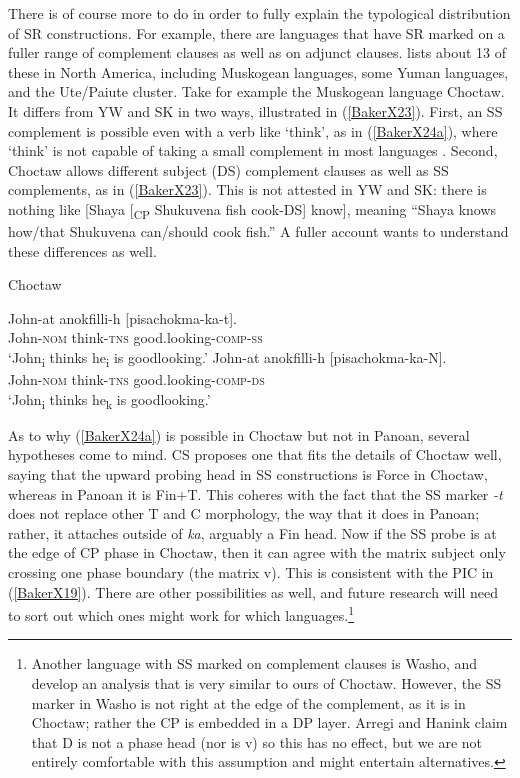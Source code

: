\documentclass[output=paper]{langscibook}
\begin{document}
There is of course more to do in order to fully explain the typological distribution of SR constructions. For example, there are languages that have SR marked on a fuller range of complement clauses as well as on adjunct clauses. \citet{mckenzie2015survey} lists about 13 of these in North America, including Muskogean languages, some Yuman languages, and the Ute/Paiute cluster. Take for example the Muskogean language Choctaw. It differs from YW and SK in two ways, illustrated in (\ref{BakerX23}). First, an SS complement is possible even with a verb like ‘think’, as in (\ref{BakerX24a}), where ‘think’ is not capable of taking a small complement in most languages \citep{wurmbrand2001infinitives}. Second, Choctaw allows different subject (DS) complement clauses as well as SS complements, as in (\ref{BakerX23}). This is not attested in YW and SK: there is nothing like [Shaya [\textsubscript{CP} Shukuvena fish cook-DS] know], meaning “Shaya knows how/that Shukuvena can/should cook fish.” A fuller account wants to understand these differences as well.

\begin{exe}
    \ex Choctaw \citep[269]{broadwell2006choctaw} \label{BakerX24}
	    \begin{xlist}
			\ex \label{BakerX24a}
			\gll John-at anokfilli-h [pisachokma-ka-t].\\
			    John-\textsc{nom} think-\textsc{tns} good.looking-\textsc{comp-ss}\\
			    \glt `John\textsubscript{i} thinks he\textsubscript{i} is goodlooking.'
			\ex \label{BakerX24b}
			\gll John-at anokfilli-h [pisachokma-ka-N].\\
    			 John-\textsc{nom} think-\textsc{tns} good.looking-\textsc{comp-ds}\\
			    \glt `John\textsubscript{i} thinks he\textsubscript{k} is goodlooking.'
		\end{xlist}
\end{exe}

As to why (\ref{BakerX24a}) is possible in Choctaw but not in Panoan, several hypotheses come to mind. CS proposes one that fits the details of Choctaw well, saying that the upward probing head in SS constructions is Force in Choctaw, whereas in Panoan it is Fin+T. This coheres with the fact that the SS marker \textit{-t} does not replace other T and C morphology, the way that it does in Panoan; rather, it attaches outside of \textit{ka}, arguably a Fin head. Now if the SS probe is at the edge of CP phase in Choctaw, then it can agree with the matrix subject only crossing one phase boundary (the matrix v). This is consistent with the PIC in (\ref{BakerX19}). There are other possibilities as well, and future research will need to sort out which ones might work for which languages.\footnote{Another language with SS marked on complement clauses is Washo, and \citet{arregi2019mark} develop an analysis that is very similar to ours of Choctaw. However, the SS marker in Washo is not right at the edge of the complement, as it is in Choctaw; rather the CP is embedded in a DP layer. Arregi and Hanink claim that D is not a phase head (nor is v) so this has no effect, but we are not entirely comfortable with this assumption and might entertain alternatives.}
\end{document}
